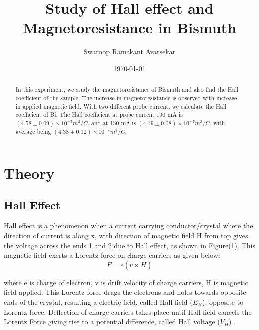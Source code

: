 \documentclass[a4paper, amsfonts, amssymb, amsmath, reprint, showkeys, nofootinbib, twoside]{revtex4-1}
\begin{document}
\title{Study of Hall effect and Magnetoresistance in Bismuth}
\author{Swaroop Ramakant Avarsekar}
\date{\today}
	
\begin{abstract}
In this experiment, we study the magnetoresistance of Bismuth and also find the Hall coefficient of the sample. The increase in magnetoresistance is observed with increase in applied magnetic field. With two different probe current, we calculate the Hall coefficient of Bi. The Hall coefficient at probe current 190 mA is $(4.58\pm0.09) \times10^{-7} m^3/C$. and at 150 mA is $(4.19\pm0.08) \times10^{-7} m^3/C$, with average being $(4.38\pm0.12) \times10^{-7} m^3/C$. 
\end{abstract}
	
	
\maketitle

\section{Theory}
\subsection{Hall Effect}
Hall effect is a phenomenon when a current carrying conductor/crystal where the direction of current is along x, with direction of magnetic field H from top gives the voltage across the ends 1 and 2 due to Hall effect, as shown in Figure(1). This magnetic field exerts a Lorentz force on charge carriers as given below:
\begin{equation}
	\bar{F}=e(\bar{v}\times\bar{H})
\end{equation}

where e is charge of electron, v is drift velocity of charge carriers, H is magnetic field applied. This Lorentz force drags the electrons and holes towards opposite ends of the crystal, resulting a electric field, called Hall field ($E_H$), opposite to Lorentz force. Deflection of charge carriers takes place until Hall field cancels the Lorentz Force giving rise to a potential difference, called Hall voltage ($V_H$) . 
\end{document}
